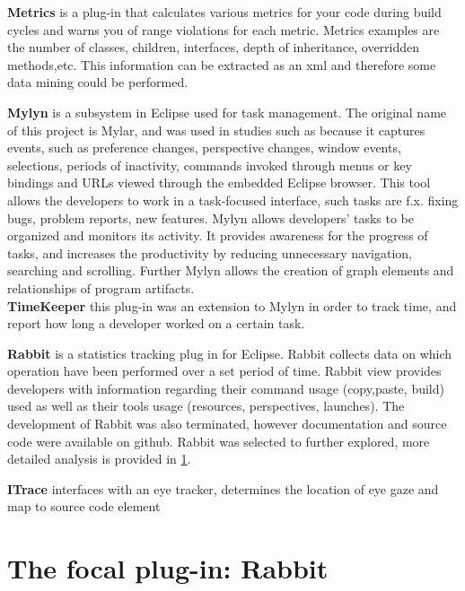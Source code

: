 \textbf{Metrics} is a plug-in that calculates various metrics for your code during build cycles and warns you of range violations for each metric.
Metrics examples are the number of classes, children, interfaces, depth of inheritance, overridden methods,etc.
This information can be extracted as an xml and therefore some data mining could be performed.

\textbf{Mylyn} is a subsystem in Eclipse used for task management. The original name of this project is Mylar, and was used in studies such as %
because it captures events, such as preference changes, 
perspective changes, window events, selections, periods of inactivity, commands invoked through menus or key bindings and URLs viewed through the embedded Eclipse browser.
This tool allows the developers to work in a task-focused interface, such tasks are f.x. fixing bugs, problem reports, new features.
Mylyn allows developers' tasks to be organized and monitors its activity. It provides awareness for the progress of tasks, and increases the productivity by reducing unnecessary navigation, searching and scrolling.
Further Mylyn allows the creation of graph elements and relationships of program artifacts.\\
\textbf{TimeKeeper} this plug-in was an extension to Mylyn in order to track time, and report how long a developer worked on a certain task.

\textbf{Rabbit} is a statistics tracking plug in for Eclipse. Rabbit collects data on which operation have been performed over a set period of time.
Rabbit view provides developers with information regarding their command usage (copy,paste, build) 
used as well as their tools usage (resources, perspectives, launches). The development of Rabbit was also terminated, however documentation and source code were available on github.
Rabbit was selected to further explored, more detailed analysis is provided in \ref{sec:TheEclipseIDE:Rabbit}.

\textbf{ITrace} interfaces with an eye tracker, determines the location of eye
gaze and map to source code element

\section{The focal plug-in: Rabbit}
\label{sec:TheEclipseIDE:Rabbit}
